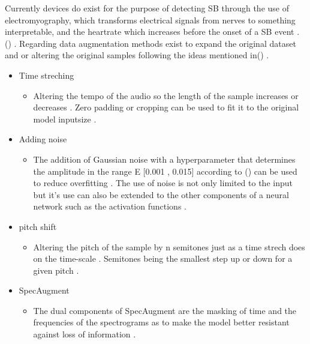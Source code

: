 \documentclass{hogent-article}
\begin{document}
Currently devices do exist for the purpose of detecting SB through the use of electromyography, which transforms electrical signals from nerves to something interpretable,  and the  heartrate which increases before the onset of a SB event . (\cite{Deregibus_2013})  .
\bigbreak
Regarding data augmentation methods exist to expand the original dataset and or altering the original samples following the ideas mentioned in() .\newline
\bigbreak

\begin{itemize}
	\item Time streching
	\bigbreak 
	\begin{itemize}
		\item Altering the tempo of the audio so the length of the sample increases or decreases .
		Zero padding or cropping can be used to fit it to the original model inputsize .
	\end{itemize}
\bigbreak
		\item Adding noise
		\bigbreak
	\begin{itemize}
		\item The addition of Gaussian noise with a hyperparameter that determines the amplitude in the range E [0.001 , 0.015] according to () can be used to reduce overfitting .
		The use of noise is not only limited to the input but it's use can also be extended to the other components of a neural network such as the activation functions . 
	\end{itemize}
\bigbreak
	\item pitch shift
	\bigbreak 
\begin{itemize}
	\item Altering the pitch of the sample by n semitones just as a time strech does on the time-scale .
	Semitones being the smallest step up or down for a given pitch .
	
\end{itemize}
\bigbreak
	\item SpecAugment
	\bigbreak
\begin{itemize}
	\item The dual components of SpecAugment are the masking of time and the frequencies of the spectrograms as to make the model better resistant against loss of information .
\end{itemize}
\end{itemize}






\bigbreak
\end{document}
